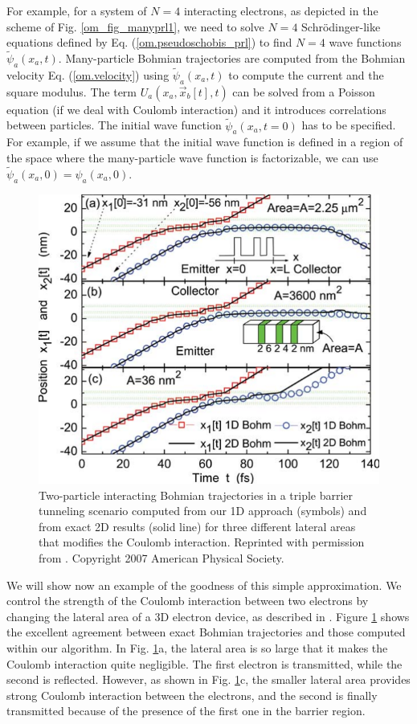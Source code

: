 \documentclass[onecolumn,nofootinbib, secnumarabic, amsmath, nobibnotes,11pt,aps,pra]{revtex4-1}
\newcommand{\fref}[1]{Fig. \ref{#1}}
\newcommand{\eref}[1]{Eq. (\ref{#1})}
\newcommand{\Fref}[1]{Figure \ref{#1}}
\begin{document}
For example, for a system of $N = 4$ interacting electrons, as
depicted in the scheme  of \fref{om_fig_manyprl1}, we need to solve
$N = 4$ Schr\"odinger-like  equations defined by  \eref{om.pseudoschobis_prl} to find $N =
4$ wave functions $\tilde{\psi}_a(x_a,t)$. Many-particle Bohmian
trajectories are computed from the Bohmian velocity
\eref{om.velocity} using $\tilde{\psi}_a(x_a,t)$ to compute the
current and the square modulus. The term \textit{$U_{a}(x_{a},\vec
x_{b}[t],t)$} can be solved from a Poisson equation (if we deal with
Coulomb interaction) and it introduces correlations between
particles. The initial wave function $\tilde{\psi}_a(x_a,t = 0)$ has
to be specified. For example, if we assume that the initial wave
function is defined in a region of the space where the many-particle
wave function is factorizable, we can use $\tilde{\psi}_a(x_a,0) =
{\psi}_a(x_a,0)$.

\begin{figure}
\includegraphics{ch1-05.pdf}
\caption{Two-particle interacting Bohmian trajectories in a triple barrier tunneling scenario
computed from our 1D approach (symbols) and from exact 2D results
(solid line) for three different lateral areas that modifies the
Coulomb interaction. Reprinted with permission from
\cite{om.oriolsprl}. Copyright 2007 American Physical Society.}
\label{om_fig_prl1}
\end{figure}

We will show now an example of the goodness of this simple
approximation. We control the strength of the Coulomb interaction
between two electrons by changing the lateral area of a 3D electron
device, as described in \cite{om.oriolsprl}. \Fref{om_fig_prl1}
shows the excellent agreement between exact Bohmian trajectories and
those computed within our algorithm. In \fref{om_fig_prl1}a, the
lateral area is so large that it makes the Coulomb interaction quite
negligible. The first electron is transmitted, while the second is
reflected. However, as shown in \fref{om_fig_prl1}c, the smaller lateral area
provides strong Coulomb interaction between the electrons, and the
second is finally transmitted because of the presence of the first
one in the barrier region.
\end{document}
